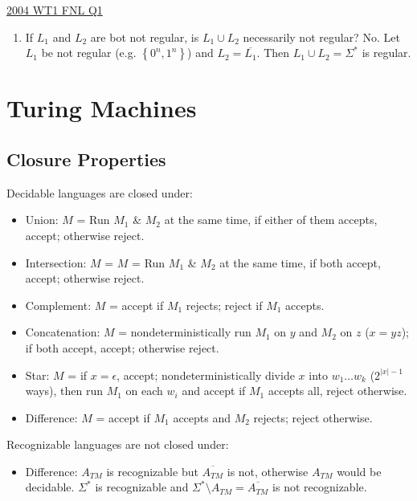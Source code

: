 \documentclass[10pt,landscape,a4paper]{article}
\newcommand{\set}[1]{\left \{ #1 \right \}}
\newcommand{\abs}[1]{\left | #1 \right |}
\begin{document}
\begin{multicols*}{3}
\underline{2004 WT1 FNL Q1}

\begin{enumerate}[label=\emph{\alph*)}]
    \item If $L_1$ and $L_2$ are bot not regular, is $L_1 \cup L_2$ necessarily not regular? No. Let $L_1$ be not regular (e.g. $\set{0^n, 1^n}$) and $L_2 = \overline{L_1}$. Then $L_1 \cup L_2 = \Sigma^*$ is regular.
\end{enumerate}

\section{Turing Machines}

\subsection{Closure Properties}

Decidable languages are closed under:

\begin{itemize}
    \item Union: $M$ = Run $M_1$ \& $M_2$ at the same time, if either of them accepts, accept; otherwise reject.
    \item Intersection: $M$ = $M$ = Run $M_1$ \& $M_2$ at the same time, if both accept, accept; otherwise reject.
    \item Complement: $M$ = accept if $M_1$ rejects; reject if $M_1$ accepts.
    \item Concatenation: $M$ = nondeterministically run $M_1$ on $y$ and $M_2$ on $z$ ($x = yz$); if both accept, accept; otherwise reject.
    \item Star: $M$ = if $x = \epsilon$, accept; nondeterministically divide $x$ into $w_1\ldots w_k$ ($2^{\abs{x}-1}$ ways), then run $M_1$ on each $w_i$ and accept if $M_1$ accepts all, reject otherwise.
    \item Difference: $M$ = accept if $M_1$ accepts and $M_2$ rejects; reject otherwise.
\end{itemize}

Recognizable languages are not closed under:

\begin{itemize}
    \item Difference: $A_{TM}$ is recognizable but $\overline{A_{TM}}$ is not, otherwise $A_{TM}$ would be decidable. $\Sigma^*$ is recognizable and $\Sigma^* \setminus A_{TM} = \overline{A_{TM}}$ is not recognizable.
\end{itemize}


\end{multicols*}
\end{document}
